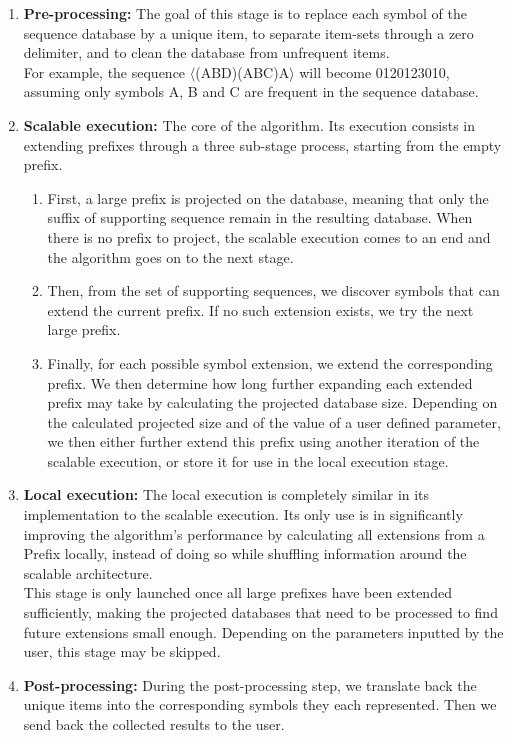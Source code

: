 \documentclass{eplmastersthesis}
\begin{document}
\begin{enumerate}
\item \textbf{Pre-processing:} The goal of this stage is to replace each symbol of the sequence database by a unique item, to separate item-sets through a zero delimiter, and to clean the database from unfrequent items. \\
For example, the sequence $\langle$(ABD)(ABC)A$\rangle$ will become 0120123010, assuming only symbols A, B and C are frequent in the sequence database.
\item \textbf{Scalable execution:} The core of the algorithm. Its execution consists in extending prefixes through a three sub-stage process, starting from the empty prefix.
	\begin{enumerate}
	\item First, a large prefix is projected on the database, meaning that only the suffix of supporting sequence remain in the resulting database. When there is no prefix to project, the scalable execution comes to an end and the algorithm goes on to the next stage.
	\item Then, from the set of supporting sequences, we discover symbols that can extend the current prefix. If no such extension exists, we try the next large prefix.
	\item Finally, for each possible symbol extension, we extend the corresponding prefix. We then determine how long further expanding each extended prefix may take by calculating the projected database size. Depending on the calculated projected size and of the value of a user defined parameter, we then either further extend this prefix using another iteration of the scalable execution, or store it for use in the local execution stage. 
	\end{enumerate}
\item \textbf{Local execution:} The local execution is completely similar in its implementation to the scalable execution. Its only use is in significantly improving the algorithm's performance by calculating all extensions from a Prefix locally, instead of doing so while shuffling information around the scalable architecture. \\
This stage is only launched once all large prefixes have been extended sufficiently, making the projected databases that need to be processed to find future extensions small enough. Depending on the parameters inputted by the user, this stage may be skipped.
\item \textbf{Post-processing:} During the post-processing step, we translate back the unique items into the corresponding symbols they each represented. Then we send back the collected results to the user.
\end{enumerate}
\end{document}
